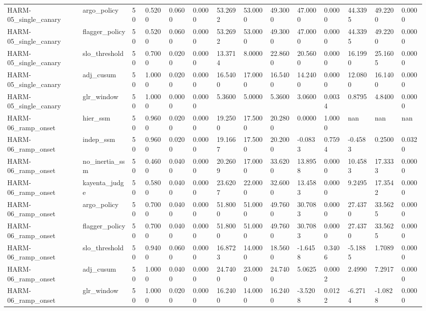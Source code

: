 \begin{table}[htbp]
\begin{tabular}{llllllllllllll}
HARM-05\_single\_canary & argo\_policy & 50 & 0.5200 & 0.0600 & 0.0000 & 53.2692 & 53.0000 & 49.3000 & 47.0000 & 0.0000 & 44.3395 & 49.2200 & 0.0000 \\
HARM-05\_single\_canary & flagger\_policy & 50 & 0.5200 & 0.0600 & 0.0000 & 53.2692 & 53.0000 & 49.3000 & 47.0000 & 0.0000 & 44.3395 & 49.2200 & 0.0000 \\
HARM-05\_single\_canary & slo\_threshold & 50 & 0.7000 & 0.0200 & 0.0000 & 13.3714 & 8.0000 & 22.8600 & 20.5600 & 0.0000 & 16.1990 & 25.1605 & 0.0000 \\
HARM-05\_single\_canary & adj\_cusum & 50 & 1.0000 & 0.0200 & 0.0000 & 16.5400 & 17.0000 & 16.5400 & 14.2400 & 0.0000 & 12.0800 & 16.1400 & 0.0000 \\
HARM-05\_single\_canary & glr\_window & 50 & 1.0000 & 0.0000 & 0.0000 & 5.3600 & 5.0000 & 5.3600 & 3.0600 & 0.0034 & 0.8795 & 4.8400 & 0.0000 \\
HARM-06\_ramp\_onset & hier\_ssm & 50 & 0.9600 & 0.0200 & 0.0000 & 19.2500 & 17.5000 & 20.2800 & 0.0000 & 1.0000 & nan & nan & nan \\
HARM-06\_ramp\_onset & indep\_ssm & 50 & 0.9600 & 0.0200 & 0.0000 & 19.1667 & 17.5000 & 20.2000 & -0.0833 & 0.7594 & -0.4583 & 0.2500 & 0.0320 \\
HARM-06\_ramp\_onset & no\_inertia\_ssm & 50 & 0.4600 & 0.0400 & 0.0000 & 20.2609 & 17.0000 & 33.6200 & 13.8958 & 0.0000 & 10.4583 & 17.3333 & 0.0000 \\
HARM-06\_ramp\_onset & kayenta\_judge & 50 & 0.5800 & 0.0400 & 0.0000 & 23.6207 & 22.0000 & 32.6000 & 13.4583 & 0.0000 & 9.2495 & 17.3542 & 0.0000 \\
HARM-06\_ramp\_onset & argo\_policy & 50 & 0.7000 & 0.0400 & 0.0000 & 51.8000 & 51.0000 & 49.7600 & 30.7083 & 0.0000 & 27.4370 & 33.5625 & 0.0000 \\
HARM-06\_ramp\_onset & flagger\_policy & 50 & 0.7000 & 0.0400 & 0.0000 & 51.8000 & 51.0000 & 49.7600 & 30.7083 & 0.0000 & 27.4370 & 33.5625 & 0.0000 \\
HARM-06\_ramp\_onset & slo\_threshold & 50 & 0.9400 & 0.0600 & 0.0000 & 16.8723 & 14.0000 & 18.5600 & -1.6458 & 0.3406 & -5.1885 & 1.7089 & 0.0000 \\
HARM-06\_ramp\_onset & adj\_cusum & 50 & 1.0000 & 0.0400 & 0.0000 & 24.7400 & 23.0000 & 24.7400 & 5.0625 & 0.0002 & 2.4990 & 7.2917 & 0.0000 \\
HARM-06\_ramp\_onset & glr\_window & 50 & 1.0000 & 0.0200 & 0.0000 & 16.2400 & 14.0000 & 16.2400 & -3.5208 & 0.0122 & -6.2714 & -1.0828 & 0.0000 \\

\end{tabular}
\end{table}
